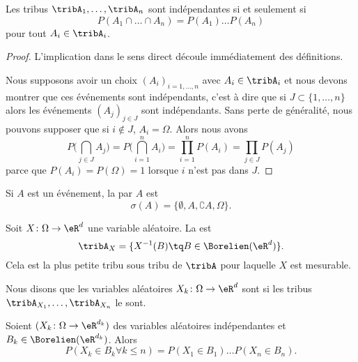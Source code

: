\begin{lemma}       \label{LemTribIndepProdProb}
    Les tribus \( \tribA_1,\ldots,\tribA_n\) sont indépendantes si et seulement si
    \begin{equation}
        P(A_1\cap\ldots\cap A_n)=P(A_1)\ldots P(A_n)
    \end{equation}
    pour tout \( A_i\in\tribA_i\).
\end{lemma}

\begin{proof}
    L'implication dans le sens direct découle immédiatement des définitions.

    Nous supposons avoir un choix \( (A_i)_{i=1,\ldots,n}\) avec \( A_i\in\tribA_i\) et nous devons montrer que ces événements sont indépendants, c'est à dire que si \( J\subset\{ 1,\ldots,n \}\) alors les événements \( (A_j)_{j\in J}\) sont indépendants. Sans perte de généralité, nous pouvons supposer que si \( i\notin J\), \( A_i=\Omega\). Alors nous avons
    \begin{equation}
        P\big( \bigcap_{j\in J}A_j \big)=P\big( \bigcap_{i=1}^nA_i \big)=\prod_{i=1}^nP(A_i)=\prod_{j\in J}P(A_j)
    \end{equation}
    parce que \( P(A_i)=P(\Omega)=1\) lorsque \( i\) n'est pas dans \( J\).
\end{proof}

Si \( A\) est un événement, la  par \( A\) est
\begin{equation}
    \sigma(A)=\{ \emptyset,A,\complement A,\Omega \}.
\end{equation}

Soit \( X\colon \Omega\to \eR^d\) une variable aléatoire. La  est
\begin{equation}
    \tribA_X=\{ X^{-1}(B)\tq B\in\Borelien(\eR^d) \}.
\end{equation}
Cela est la plus petite tribu sous tribu de \( \tribA\) pour laquelle \( X\) est mesurable.

Nous disons que les variables aléatoires \( X_k\colon \Omega\to \eR^d\) sont  si les tribus \( \tribA_{X_1},\ldots,\tribA_{X_n}\) le sont.

\begin{proposition}
    Soient \( (X_k\colon \Omega\to \eR^{d_k})\) des variables aléatoires indépendantes et \( B_k\in \Borelien(\eR^{d_k})\). Alors
    \begin{equation}
        P(X_k\in B_k\forall k\leq n)=P(X_1\in B_1)\ldots P(X_n\in B_n).
    \end{equation}
\end{proposition}

